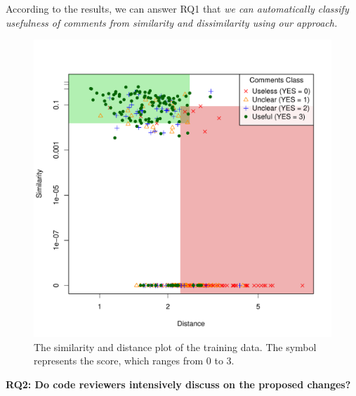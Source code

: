\documentclass[conference]{IEEEtran}
\begin{document}
According to the results, we can answer  RQ1 that \textit{we can automatically classify usefulness of comments from similarity and dissimilarity using our approach.}



\begin{figure}[!t]
\centering
\includegraphics[scale=0.55, trim=0 0 30 50, clip=true]{scatter_log}
\caption{The similarity and distance plot of the training data.
The symbol represents the score, which ranges from 0 to 3.}
\label{fig:scatter}
\end{figure}

\noindent \textbf{RQ2: Do code reviewers intensively discuss on the proposed changes?}\\
\end{document}
